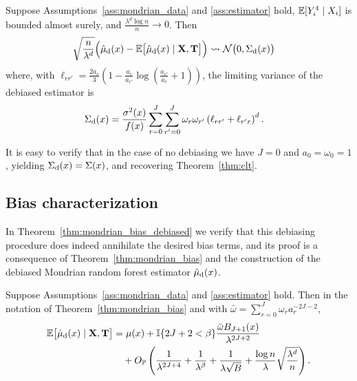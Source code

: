 \begin{theorem}%
  \label{thm:clt_debiased}
  Suppose Assumptions~\ref{ass:mondrian_data} and \ref{ass:estimator} hold,
  $\mathbb{E}[Y_i^4 \mid X_i ]$ is bounded almost surely,
  and $\frac{\lambda^d \log n}{n} \to 0$. Then
  \begin{align*}
    \sqrt{\frac{n}{\lambda^d}}
    \Big(
      \hat \mu_{\mathrm{d}}(x)
      - \mathbb{E} \big[ \hat \mu_{\mathrm{d}}(x) \mid \mathbf{X}, \mathbf{T} \big]
    \Big)
    &\rightsquigarrow
    \mathcal{N}\big(0, \Sigma_{\mathrm{d}}(x)\big)
  \end{align*}
  where, with $\ell_{r r'} = \frac{2 a_r}{3} \left( 1 - \frac{a_{r}}{a_{r'}}
  \log\left(\frac{a_{r'}}{a_{r}} + 1\right) \right)$,
  the limiting variance of the debiased estimator is
  \begin{align*}
    \Sigma_{\mathrm{d}}(x)
    &=
    \frac{\sigma^2(x)}{f(x)}
    \sum_{r=0}^{J} \sum_{r'=0}^{J} \omega_r \omega_{r'}
    \left( \ell_{r r'} + \ell_{r' r} \right)^d.
  \end{align*}
\end{theorem}

It is easy to verify that in the case of no debiasing we have
$J=0$ and $a_0 = \omega_0 = 1$, yielding
$\Sigma_{\mathrm{d}}(x) = \Sigma(x)$, and recovering Theorem~\ref{thm:clt}.

\subsection*{Bias characterization}

In Theorem~\ref{thm:mondrian_bias_debiased} we verify that this debiasing
procedure does indeed annihilate the desired bias terms, and its proof is a
consequence of Theorem~\ref{thm:mondrian_bias} and the construction of the
debiased Mondrian random forest estimator $\hat\mu_{\mathrm{d}}(x)$.

\begin{theorem}%
  \label{thm:mondrian_bias_debiased}
  Suppose Assumptions~\ref{ass:mondrian_data} and \ref{ass:estimator} hold.
  Then in the notation of Theorem~\ref{thm:mondrian_bias} and with
  $\bar\omega = \sum_{r=0}^J \omega_r a_r^{-2J - 2}$,
  \begin{align*}
    \mathbb{E} \big[ \hat \mu_{\mathrm{d}}(x) \mid \mathbf{X}, \mathbf{T} \big]
    &= \mu(x) + \mathbb{I}\{2J+2 < \beta \}
    \frac{\bar\omega B_{J+1}(x)}{\lambda^{2J + 2}} \\
    &\quad+
    O_{\mathbb{P}} \left(
      \frac{1}{\lambda^{2J + 4}}
      + \frac{1}{\lambda^\beta}
      + \frac{1}{\lambda \sqrt B}
      + \frac{\log n}{\lambda} \sqrt{\frac{\lambda^d}{n}}
    \right).
  \end{align*}
\end{theorem}

